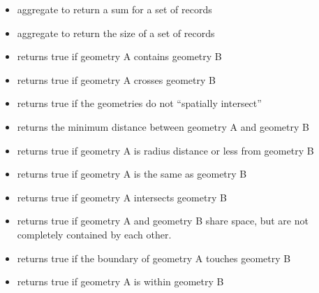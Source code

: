 \documentclass[a4paper,11pt,english]{sphinxmanual}
\begin{document}
\begin{itemize}
\item {} 
 aggregate to return a sum for a set of records

\item {} 
 aggregate to return the size of a set of records

\item {} 
 returns true if geometry A contains geometry B

\item {} 
 returns true if geometry A crosses geometry B

\item {} 
 returns true if the geometries do not “spatially intersect”

\item {} 
 returns the minimum distance between geometry A and geometry B

\item {} 
 returns true if geometry A is radius distance or less from geometry B

\item {} 
 returns true if geometry A is the same as geometry B

\item {} 
 returns true if geometry A intersects geometry B

\item {} 
 returns true if geometry A and geometry B share space, but are not completely contained by each other.

\item {} 
 returns true if the boundary of geometry A touches geometry B

\item {} 
 returns true if geometry A is within geometry B

\end{itemize}
\end{document}
